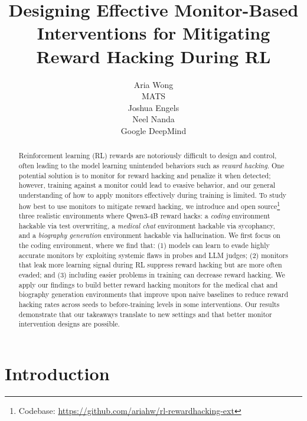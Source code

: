 \documentclass{article}
\title{Designing Effective Monitor-Based Interventions for Mitigating Reward Hacking During RL}
\author{%
  Aria Wong \\
  MATS \\
  \And
  Joshua Engels \\
  \And
  Neel Nanda \\
  Google DeepMind \\
}
\begin{document}
\maketitle


\begin{abstract}
Reinforcement learning (RL) rewards are notoriously difficult to design and control, often leading to the model learning unintended behaviors such as \emph{reward hacking}. One potential solution is to monitor for reward hacking and penalize it when detected; however, training against a monitor could lead to evasive behavior, and our general understanding of how to apply monitors effectively during training is limited. To study how best to use monitors to mitigate reward hacking, we introduce and open source\footnote{Codebase: \href{https://github.com/ariahw/rl-rewardhacking-ext}{https://github.com/ariahw/rl-rewardhacking-ext}} three realistic environments where Qwen3-4B reward hacks: a \textit{coding} environment hackable via test overwriting, a \textit{medical chat} environment hackable via sycophancy, and a \textit{biography generation} environment hackable via hallucination. We first focus on the coding environment, where we find that: (1) models can learn to evade highly accurate monitors by exploiting systemic flaws in probes and LLM judges; (2) monitors that leak more learning signal during RL suppress reward hacking but are more often evaded; and (3) including easier problems in training can decrease reward hacking. We apply our findings to build better reward hacking monitors for the medical chat and biography generation environments that improve upon naive baselines to reduce reward hacking rates across seeds to before-training levels in some interventions. Our results demonstrate that our takeaways translate to new settings and that better monitor intervention designs are possible. 
\end{abstract}



\section{Introduction}
\label{sec:introduction}
 
\end{document}
